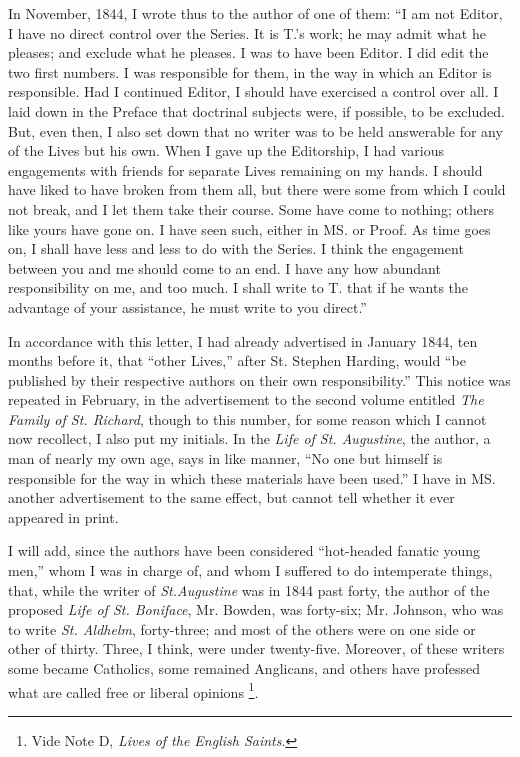 In November, 1844, I wrote thus to the author of one of them: ``I am not Editor, I have no direct control over the Series.
It is T.'s work; he may admit what he pleases; and exclude what he
pleases. I was to have been Editor. I did edit the two first numbers. I
was responsible for them, in the way in which an Editor is responsible.
Had I continued Editor, I should have exercised a control over all. I
laid down in the Preface that doctrinal subjects were, if possible, to
be excluded. But, even then, I also set down that no writer was to be
held answerable for any of the Lives but his own. When I gave up the
Editorship, I had various engagements with friends for separate Lives
remaining on my hands. I should have liked to have broken from them all,
but there were some from which I could not break, and I let them take
their course. Some have come to nothing; others like yours have gone on.
I have seen such, either in MS. or Proof. As time goes on, I shall have
less and less to do with the Series. I think the engagement between you
and me should come to an end. I have any how abundant responsibility on
me, and too much. I shall write to T. that if he wants the
advantage of your assistance, he must write to you direct.''

In accordance with this letter, I had already advertised in January
1844, ten months before it, that ``other Lives,'' after St.
Stephen Harding, would ``be published by their respective
authors on their own responsibility.'' This notice was repeated in February, in the advertisement to the second volume entitled
\emph{The Family of St. Richard}, though to this number, for some reason
which I cannot now recollect, I also put
my initials. In the \emph{Life of St. Augustine}, the author, a man of nearly
my own age, says in like manner, ``No one but himself is responsible
for the way in which these materials have been used.'' I have in MS.
another advertisement to the same effect, but cannot tell whether it
ever appeared in print.

I will add, since the authors have been considered ``hot-headed
fanatic young men,'' whom I was in charge of, and whom I suffered to
do intemperate
things, that, while the writer of \emph{St.}\emph{Augustine} was in 1844 past
forty, the author of the proposed \emph{Life of
St. Boniface}, Mr. Bowden, was forty-six; Mr. Johnson, who was to write
\emph{St. Aldhelm}, forty-three; and most of the others were on one side
or other of thirty. Three, I think, were under twenty-five.
Moreover, of these writers some became Catholics, some remained
Anglicans, and others have professed what are called free or liberal
opinions \footnote{Vide Note D, \emph{Lives of the
English Saints}.}.

